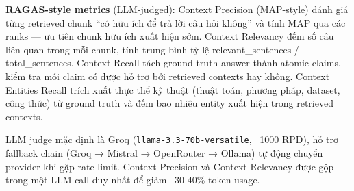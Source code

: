\textbf{RAGAS-style metrics} (LLM-judged): Context Precision (MAP-style) đánh giá từng retrieved chunk ``có hữu ích để trả lời câu hỏi không'' và tính MAP qua các ranks — ưu tiên chunk hữu ích xuất hiện sớm. Context Relevancy đếm số câu liên quan trong mỗi chunk, tính trung bình tỷ lệ relevant\_sentences / total\_sentences. Context Recall tách ground-truth answer thành atomic claims, kiểm tra mỗi claim có được hỗ trợ bởi retrieved contexts hay không. Context Entities Recall trích xuất thực thể kỹ thuật (thuật toán, phương pháp, dataset, công thức) từ ground truth và đếm bao nhiêu entity xuất hiện trong retrieved contexts.

LLM judge mặc định là Groq (\texttt{llama-3.3-70b-versatile}, ~1000 RPD), hỗ trợ fallback chain (Groq → Mistral → OpenRouter → Ollama) tự động chuyển provider khi gặp rate limit. Context Precision và Context Relevancy được gộp trong một LLM call duy nhất để giảm ~30-40\% token usage.